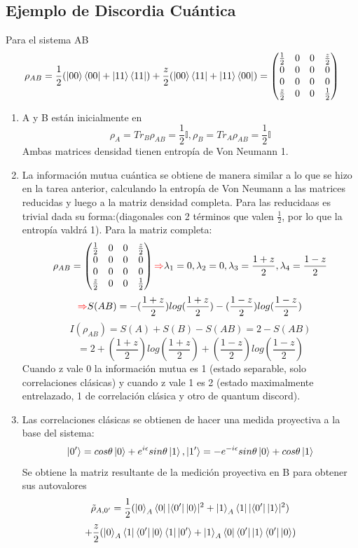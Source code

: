 \documentclass{book}
\begin{document}
\subsection{Ejemplo de Discordia Cuántica} Para el sistema AB $$\rho_{AB}=\frac{1}{2}(\ket{00}\bra{00}+\ket{11}\bra{11})+\frac{z}{2}(\ket{00}\bra{11}+\ket{11}\bra{00})=\begin{pmatrix}\frac{1}{2}&0&0&\frac{z}{2}\\0&0&0&0\\0&0&0&0\\ \frac{z}{2}&0&0&\frac{1}{2}\end{pmatrix}$$\begin{enumerate}
    \item A y B están inicialmente en $$\rho_A=Tr_B\rho_{AB}=\frac{1}{2}\mathbb{I}, \rho_B=Tr_A\rho_{AB}=\frac{1}{2}\mathbb{I}$$ Ambas matrices densidad tienen entropía de Von Neumann 1.
    \item La información mutua cuántica se obtiene de manera similar a lo que se hizo en la tarea anterior, calculando la entropía de Von Neumann a las matrices reducidas y luego a la matriz densidad completa. Para las reducidaas es trivial dada su forma:(diagonales con 2 términos que valen $\frac{1}{2}$, por lo que la entropía valdrá 1). Para la matriz completa:
    $$\rho_{AB}=\begin{pmatrix}\frac{1}{2}&0&0&\frac{z}{2}\\0&0&0&0\\0&0&0&0\\  \frac{z}{2}&0&0&\frac{1}{2}\end{pmatrix} \textcolor{red}{\Rightarrow} \lambda_1=0,\lambda_2=0,\lambda_3=\frac{1+z}{2},\lambda_4=\frac{1-z}{2}$$ $$\textcolor{red}{\Rightarrow} S(AB)=-(\frac{1+z}{2})log(\frac{1+z}{2})-(\frac{1-z}{2})log(\frac{1-z}{2})$$ $$I(\rho_{AB})=S(A)+S(B)-S(AB)=2-S(AB)$$
    $$ =2+(\frac{1+z}{2})log(\frac{1+z}{2})+(\frac{1-z}{2})log(\frac{1-z}{2})$$ Cuando z vale 0 la información mutua es 1 (estado separable, solo correlaciones clásicas) y cuando z vale 1 es 2 (estado maximalmente entrelazado, 1 de correlación clásica y otro de quantum discord).  
    \item Las correlaciones clásicas se obtienen de hacer una medida proyectiva a la base del sistema: 
    $$\ket{0^\prime}=cos\theta\ket{0}+e^{i\epsilon}sin\theta\ket{1},\ket{1^\prime}=-e^{-i\epsilon}sin\theta\ket{0}+cos\theta\ket{1}$$
    Se obtiene la matriz resultante de la medición proyectiva en B para obtener sus autovalores
    $$\Tilde{\rho}_{A,0^\prime}=\frac{1}{2}(\ket{0}_A\bra{0}\lvert\bra{0^\prime}\ket{0}\rvert^2+\ket{1}_A\bra{1}\lvert\bra{0^\prime}\ket{1}\rvert^2)$$ $$+\frac{z}{2}(\ket{0}_A\bra{1}\bra{0^\prime}\ket{0}\bra{1}\ket{0^\prime}+\ket{1}_A\bra{0}\bra{0^\prime}\ket{1}\bra{0^\prime}\ket{0})$$

\end{enumerate}
\end{document}

